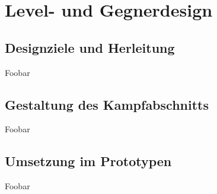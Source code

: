\documentclass[../Main.tex]{subfiles}
\begin{document}
\section{Level- und Gegnerdesign}

\subsection{Designziele und Herleitung}

Foobar

\subsection{Gestaltung des Kampfabschnitts}

Foobar

\subsection{Umsetzung im Prototypen}

Foobar
\end{document}
